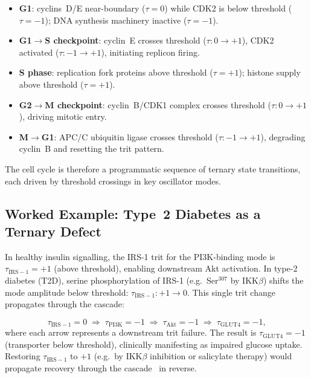 \begin{itemize}[nosep]
    \item \textbf{G1}: cyclins~D/E near-boundary ($\tau=0$) while CDK2 is
          below threshold ($\tau=-1$); DNA synthesis machinery inactive ($\tau=-1$).
    \item \textbf{G1$\to$S checkpoint}: cyclin~E crosses threshold ($\tau:
          0\to+1$), CDK2 activated ($\tau:-1\to+1$), initiating replicon firing.
    \item \textbf{S phase}: replication fork proteins above threshold ($\tau=+1$);
          histone supply above threshold ($\tau=+1$).
    \item \textbf{G2$\to$M checkpoint}: cyclin~B/CDK1 complex crosses threshold
          ($\tau:0\to+1$), driving mitotic entry.
    \item \textbf{M$\to$G1}: APC/C ubiquitin ligase crosses threshold
          ($\tau:-1\to+1$), degrading cyclin~B and resetting the trit pattern.
\end{itemize}

The cell cycle is therefore a programmatic sequence of ternary state
transitions, each driven by threshold crossings in key oscillator modes.

\subsection{Worked Example: Type~2 Diabetes as a Ternary Defect}

In healthy insulin signalling, the IRS-1 trit for the PI3K-binding mode is
$\tau_{\mathrm{IRS-1}}=+1$ (above threshold), enabling downstream Akt
activation.  In type-2 diabetes (T2D), serine phosphorylation of IRS-1
(e.g.\ Ser$^{307}$ by IKK$\beta$) shifts the mode amplitude below threshold:
$\tau_{\mathrm{IRS-1}}:+1\to 0$.  This single trit change propagates through
the cascade:

\begin{equation}
    \tau_{\mathrm{IRS-1}}=0
    \;\Rightarrow\;
    \tau_{\mathrm{PI3K}}=-1
    \;\Rightarrow\;
    \tau_{\mathrm{Akt}}=-1
    \;\Rightarrow\;
    \tau_{\mathrm{GLUT4}}=-1,
    \label{eq:ch03-t2d-trit}
\end{equation}
where each arrow represents a downstream trit failure.  The result is
$\tau_{\mathrm{GLUT4}}=-1$ (transporter below threshold), clinically
manifesting as impaired glucose uptake.  Restoring $\tau_{\mathrm{IRS-1}}$
to $+1$ (e.g.\ by IKK$\beta$ inhibition or salicylate therapy) would
propagate recovery through the cascade~ in reverse.

